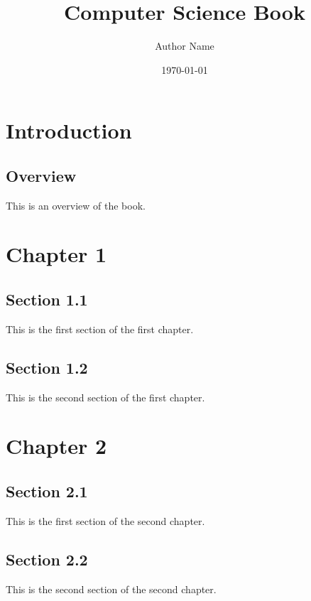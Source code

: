 \documentclass{book}
\begin{document}
\title{Computer Science Book}
\author{Author Name}
\date{\today}

\maketitle

\tableofcontents

\chapter{Introduction}
\section{Overview}
This is an overview of the book.

\chapter{Chapter 1}
\section{Section 1.1}
This is the first section of the first chapter.

\section{Section 1.2}
This is the second section of the first chapter.

\chapter{Chapter 2}
\section{Section 2.1}
This is the first section of the second chapter.

\section{Section 2.2}
This is the second section of the second chapter.
\end{document}
